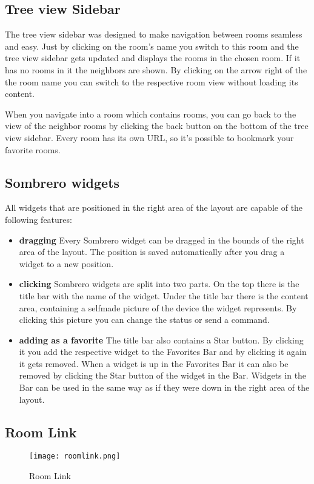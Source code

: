 \subsection{Tree view Sidebar}
  The tree view sidebar was designed to make navigation between rooms seamless and easy. Just by clicking on the room's name you switch to this room and the tree view sidebar gets updated and displays the rooms in the chosen room. If it has no rooms in it the neighbors are shown. By clicking on the arrow right of the the room name you can switch to the respective room view without loading its content.

  When you navigate into a room which contains rooms, you can go back to the view of the neighbor rooms by clicking the back button on the bottom of the tree view sidebar. Every room has its own URL, so it's possible to bookmark your favorite rooms.

\subsection{Sombrero widgets}
    All widgets that are positioned in the right area of the layout are capable of the following features:
    \begin{itemize}
        \item \textbf{dragging}
            Every Sombrero widget can be dragged in the bounds of the right area of the layout. The position is saved automatically after you drag a widget to a new position.
        \item \textbf{clicking}
            Sombrero widgets are split into two parts. On the top there is the title bar with the name of the widget. Under the title bar there is the content area, containing a selfmade picture of the device the widget represents. By clicking this picture you can change the status or send a command.
        \item \textbf{adding as a favorite}
            The title bar also contains a Star button. By clicking it you add the respective widget to the Favorites Bar and by clicking it again it gets removed. When a widget is up in the Favorites Bar it can also be removed by clicking the Star button of the widget in the Bar. Widgets in the Bar can be used in the same way as if they were down in the right area of the layout.
    \end{itemize}
\subsection{Room Link}
  \begin{figure}[h]
  \centering
  \texttt{[image: roomlink.png]}
  \caption{Room Link}
  \label{fig:roomlink}
  \end{figure}

